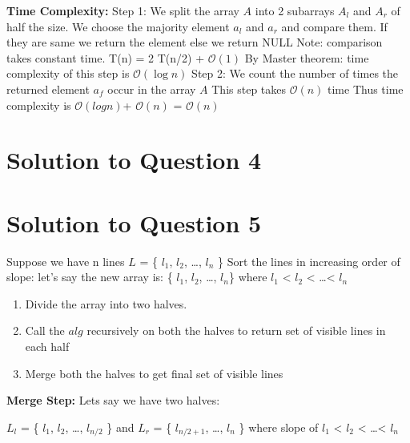 \documentclass[11pt]{article}
\renewcommand{\O}{\mathcal{O}}
\begin{document}
{\bf Time Complexity:}\newline
Step 1: We split the array $A$ into 2 subarrays $A_l$ and $A_r$ of half the size. We choose the majority element $a_l$ and $a_r$
and compare them. If they are same we return the element else we return NULL\newline
Note: comparison takes constant time.\newline
T(n) = 2 T(n/2) + $\O(1)$ \newline
By Master theorem: time complexity of this step is $\O(\log n)$ \newline
Step 2: We count the number of times the returned element $a_f$ occur in the array $A$ \newline
This step takes $\O(n)$ time \newline
Thus time complexity is $\O(log n)$+ $\O(n)$ \newline
= $\O(n)$


\section{Solution to Question 4}



\section{Solution to Question 5}

Suppose we have n lines $L$ = \{ $l_1$, $l_2$, \dots, $l_n$ \} \newline
Sort the lines in increasing order of slope: \newline
let's say the new array is: \{ $l_1$, $l_2$, \dots , $l_n$\} where $l_1$ < $l_2$ < \dots < $l_n$ \newline
\begin{enumerate}
\item Divide the array into two halves. \newline
\item Call the $alg$ recursively on both the halves to return set of visible lines in each half \newline
\item Merge both the halves to get final set of visible lines \newline
\end{enumerate}
{\bf Merge Step:} \newline
Lets say we have two halves: \newline

$L_l$ = \{ $l_1$, $l_2$, \dots, $l_{n/2}$ \}  and $L_r$ = \{ $l_{n/2+1}$, \dots, $l_n$ \}  \newline
where slope of $l_1$ < $l_2$ < \dots < $l_n$
\end{document}
